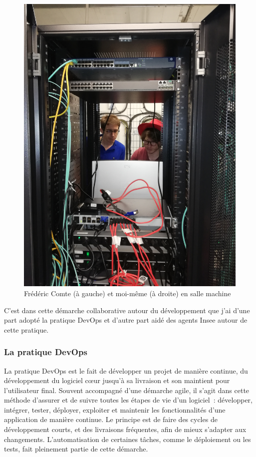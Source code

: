 \begin{figure}[H]
    \centering
    \includegraphics[scale=0.10]{images/salle-machine.jpg}
    \caption{Frédéric Comte (à gauche) et moi-même (à droite) en salle machine}
    \label{fig:salle-machine}
\end{figure}
\vspace{10pt}

C'est dans cette démarche collaborative autour du développement que j'ai d'une part adopté la pratique DevOps et d'autre part aidé des agents Insee autour de cette pratique.
\label{section 2.2.2 - Séminaire du développement}

\subsubsection{La pratique DevOps}
La pratique DevOps est le fait de développer un projet de manière continue, du développement du logiciel cœur jusqu'à sa livraison et son maintient pour l'utilisateur final. Souvent accompagné d'une démarche agile, il s'agit dans cette méthode d'assurer et de suivre toutes les étapes de vie d'un logiciel~: développer, intégrer, tester, déployer, exploiter et maintenir les fonctionnalités d'une application de manière continue. Le principe est de faire des cycles de développement courts, et des livraisons fréquentes, afin de mieux s'adapter aux changements. L'automatisation de certaines tâches, comme le déploiement ou les tests, fait pleinement partie de cette démarche.
\newline

